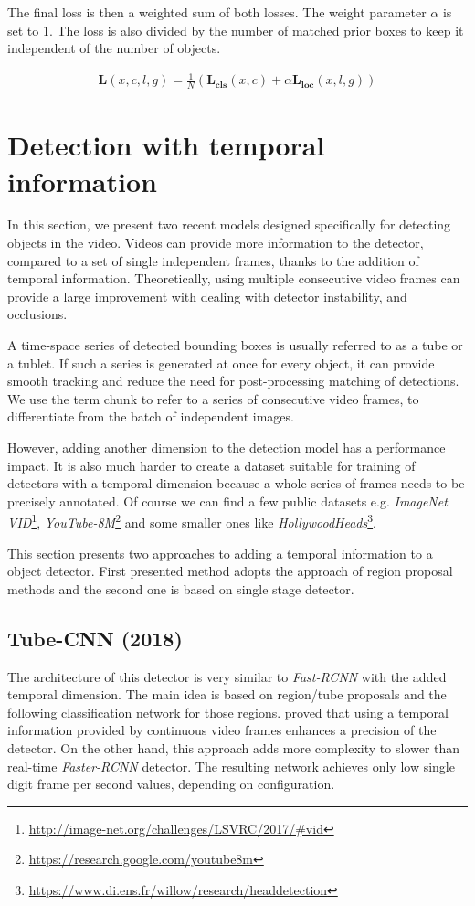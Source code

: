 \noindent The final loss is then a weighted sum of both losses. The weight parameter $\alpha$ is set to 1. The loss is also divided by the number of matched prior boxes to keep it independent of the number of objects.

\begin{align*}
\mathbf{L}(x,c,l,g) = \frac{1}{N}(\mathbf{L_{\text{cls}}}(x,c) + \alpha\mathbf{L_{\text{loc}}}(x,l,g))
\end{align*}

\section{Detection with temporal information}
\label{sec:video_det}
In this section, we present two recent models designed specifically for detecting objects in the video. Videos can provide more information to the detector, compared to a set of single independent frames, thanks to the addition of temporal information. Theoretically, using multiple consecutive video frames can provide a large improvement with dealing with detector instability, and occlusions. 

A time-space series of detected bounding boxes is usually referred to as a tube or a tublet. If such a series is generated at once for every object, it can provide smooth tracking and reduce the need for post-processing matching of detections. We use the term chunk to refer to a series of consecutive video frames, to differentiate from the batch of independent images.

However, adding another dimension to the detection model has a performance impact. It is also much harder to create a dataset suitable for training of detectors with a temporal dimension because a whole series of frames needs to be precisely annotated. Of course we can find a few public datasets e.g. \textit{ImageNet VID}\footnote{\url{http://image-net.org/challenges/LSVRC/2017/\#vid}}, \textit{YouTube-8M}\footnote{\url{https://research.google.com/youtube8m}} and some smaller ones like \textit{HollywoodHeads}\footnote{\url{https://www.di.ens.fr/willow/research/headdetection}}.

This section presents two approaches to adding a temporal information to a object detector. First presented method adopts the approach of region proposal methods and the second one is based on single stage detector.


\subsection{Tube-CNN (2018)}
\label{sed:tubecnn}
The architecture of this detector is very similar to \textit{Fast-RCNN} with the added temporal dimension. The main idea is based on region/tube proposals and the following classification network for those regions. \citeauthor{bib:tubeCNN} \cite{bib:tubeCNN} proved that using a temporal information provided by continuous video frames enhances a precision of the detector. On the other hand, this approach adds more complexity to slower than real-time \textit{Faster-RCNN} detector. The resulting network achieves only low single digit frame per second values, depending on configuration. 

